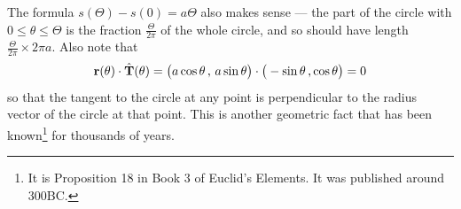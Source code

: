\begin{eg}
{\begin{efig}
\begin{center}
\end{center}
\end{efig}
}
The formula $s(\Theta)-s(0)=a\Theta$ also makes sense --- the part of the 
circle with $0\le\theta\le\Theta$ is the fraction $\frac{\Theta}{2\pi}$
of the whole circle, and so should have length $\frac{\Theta}{2\pi}\times
2\pi a$. Also note that
\begin{equation*}
\mathbf{r}(\theta)\cdot\hat{\mathbf{T}}(\theta) = \big(a\cos\theta\,,\,a\sin\theta\big)
\cdot \big(-\sin\theta\,,\cos\theta\big)
=0
\end{equation*}
so that the tangent to the circle at any point is perpendicular
to the radius vector of the circle at that point. This is another geometric fact 
that has been known\footnote{It is Proposition 18 in Book 3 of Euclid's Elements. It was published around 300BC.} for thousands of years.
\end{eg}
\goodbreak

